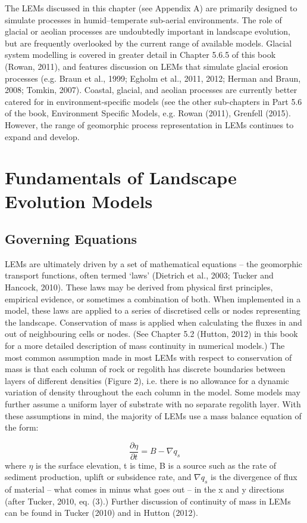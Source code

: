 The LEMs discussed in this chapter (see Appendix A) are primarily designed to simulate processes in humid–temperate sub-aerial environments. The role of glacial or aeolian processes are undoubtedly important in landscape evolution, but are frequently overlooked by the current range of available models. Glacial system modelling is covered in greater detail in Chapter 5.6.5 of this book (Rowan, 2011), and features discussion on LEMs that simulate glacial erosion processes (e.g. Braun et al., 1999; Egholm et al., 2011, 2012; Herman and Braun, 2008; Tomkin, 2007). Coastal, glacial, and aeolian processes are currently better catered for in environment-specific models (see the other sub-chapters in Part 5.6 of the book, Environment Specific Models, e.g. Rowan (2011), Grenfell (2015). However, the range of geomorphic process representation in LEMs continues to expand and develop.

\section{Fundamentals of Landscape Evolution Models}

\subsection{Governing Equations}

LEMs are ultimately driven by a set of mathematical equations – the geomorphic transport functions, often termed ‘laws’ (Dietrich et al., 2003; Tucker and Hancock, 2010). These laws may be derived from physical first principles, empirical evidence, or sometimes a combination of both. When implemented in a model, these laws are applied to a series of discretised cells or nodes representing the landscape. Conservation of mass is applied when calculating the fluxes in and out of neighbouring cells or nodes. (See Chapter 5.2 (Hutton, 2012) in this book for a more detailed description of mass continuity in numerical models.) The most common assumption made in most LEMs with respect to conservation of mass is that each column of rock or regolith has discrete boundaries between layers of different densities (Figure 2), i.e. there is no allowance for a dynamic variation of density throughout the each column in the model. Some models may further assume a uniform layer of substrate with no separate regolith layer. With these assumptions in mind, the majority of LEMs use a mass balance equation of the form:

\begin{equation*}
\frac{{\partial}\eta }{{\partial}t}=B-{\nabla}q_s
\end{equation*}
where $\eta $ is the surface elevation, t is time, B is a source such as the rate of sediment production, uplift or subsidence rate, and  ${\nabla}q_s$ is the divergence of flux of material – what comes in minus what goes out – in the x and y directions (after Tucker, 2010, eq. (3).) Further discussion of continuity of mass in LEMs can be found in Tucker (2010) and in Hutton (2012). 

